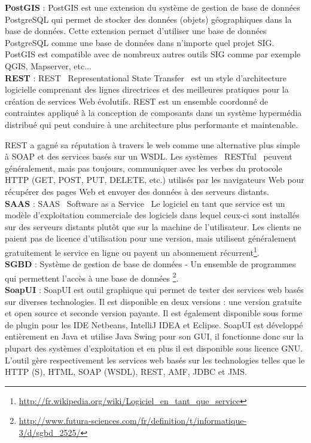 \documentclass[12pt,openany]{StyleBertrand}
\makeatletter
\providecommand{\og}{\leavevmode\flqq~}%
\providecommand{\fg}{\ifdim\lastskip>\z@\unskip\fi~\frqq}%
\makeatother
\begin{document}
\pagebreak

\textbf{PostGIS}\label{Postgis} : PostGIS est une extension du système de gestion de base de données PostgreSQL qui permet de stocker des données (objets) géographiques dans la base de données. Cette extension permet d'utiliser une base de données PostgreSQL comme une base de données dans n'importe quel projet SIG. PostGIS est compatible avec de nombreux autres outils SIG comme par exemple QGIS, Mapserver, etc...\\

\textbf{REST} : REST \og Representational State Transfer \fg ​​est un style d'architecture logicielle comprenant des lignes directrices et des meilleures pratiques pour la création de services Web évolutifs. REST est un ensemble coordonné de contraintes appliqué à la conception de composants dans un système hypermédia distribué qui peut conduire à une architecture plus performante et maintenable.

REST a gagné sa réputation à travers le web comme une alternative plus simple à SOAP et des services basés sur un WSDL. Les systèmes \og RESTful \fg peuvent généralement, mais pas toujours, communiquer avec les verbes du protocole HTTP (GET, POST, PUT, DELETE, etc.) utilisés par les navigateurs Web pour récupérer des pages Web et envoyer des données à des serveurs distants.\\


\textbf{SAAS} : SAAS \og Software as a Service \fg Le logiciel en tant que service est un modèle d'exploitation commerciale des logiciels dans lequel ceux-ci sont installés sur des serveurs distants plutôt que sur la machine de l'utilisateur. Les clients ne paient pas de licence d'utilisation pour une version, mais utilisent généralement gratuitement le service en ligne ou payent un abonnement récurrent\footnote{\url{http://fr.wikipedia.org/wiki/Logiciel_en_tant_que_service}}.\\

\textbf{SGBD} : Système de gestion de base de données - Un ensemble de programmes qui permettent l'accès à une base de données \footnote{\url{http://www.futura-sciences.com/fr/definition/t/informatique-3/d/sgbd_2525/}}.\\


\textbf{SoapUI} : SoapUI est outil graphique qui permet de tester des services web basés sur diverses technologies. Il est disponible en deux versions : une version gratuite et open source et seconde version payante. Il est également disponible sous forme de plugin pour les IDE Netbeans, IntelliJ IDEA et Eclipse. SoapUI est développé entièrement en Java et utilise Java Swing pour son GUI, il fonctionne donc sur la plupart des systèmes d'exploitation et en plus il est disponible sous licence GNU.
L'outil gère respectivement les services web basés sur les technologies telles que le HTTP (S), HTML, SOAP (WSDL), REST, AMF, JDBC et JMS.\\
\end{document}
